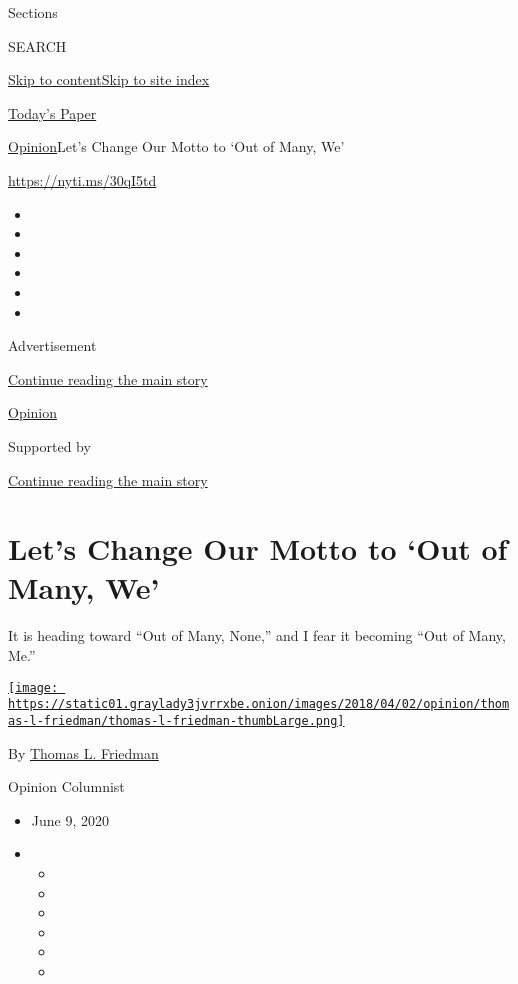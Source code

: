 Sections

SEARCH

\protect\hyperlink{site-content}{Skip to
content}\protect\hyperlink{site-index}{Skip to site index}

\href{https://myaccount.nytimes3xbfgragh.onion/auth/login?response_type=cookie\&client_id=vi}{}

\href{https://www.nytimes3xbfgragh.onion/section/todayspaper}{Today's
Paper}

\href{/section/opinion}{Opinion}\textbar{}Let's Change Our Motto to `Out
of Many, We'

\url{https://nyti.ms/30qI5td}

\begin{itemize}
\item
\item
\item
\item
\item
\item
\end{itemize}

Advertisement

\protect\hyperlink{after-top}{Continue reading the main story}

\href{/section/opinion}{Opinion}

Supported by

\protect\hyperlink{after-sponsor}{Continue reading the main story}

\hypertarget{lets-change-our-motto-to-out-of-many-we}{%
\section{Let's Change Our Motto to `Out of Many,
We'}\label{lets-change-our-motto-to-out-of-many-we}}

It is heading toward ``Out of Many, None,'' and I fear it becoming ``Out
of Many, Me.''

\href{https://www.nytimes3xbfgragh.onion/by/thomas-l-friedman}{\texttt{[image: https://static01.graylady3jvrrxbe.onion/images/2018/04/02/opinion/thomas-l-friedman/thomas-l-friedman-thumbLarge.png]}}

By \href{https://www.nytimes3xbfgragh.onion/by/thomas-l-friedman}{Thomas
L. Friedman}

Opinion Columnist

\begin{itemize}
\item
  June 9, 2020
\item
  \begin{itemize}
  \item
  \item
  \item
  \item
  \item
  \item
  \end{itemize}
\end{itemize}

